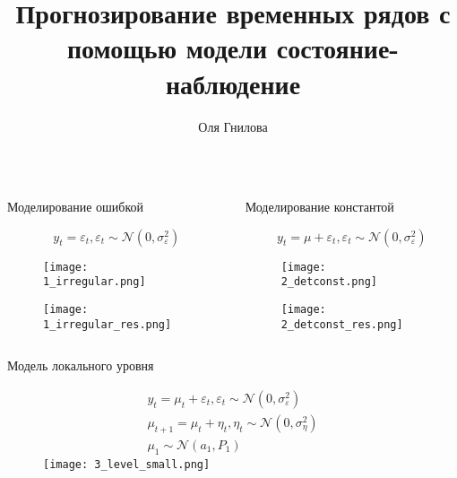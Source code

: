\documentclass{beamer}
\author[]{Оля Гнилова}
\title{Прогнозирование временных рядов с помощью модели состояние-наблюдение}
\institute{Высшая школа экономики, 2017}
\begin{document}
\begin{frame}[fragile]\centering

\begin{columns}[T]
\begin{column}{.32\textwidth}

\begin{columns}[T]
\begin{column}{.49\textwidth}

\begin{block}{ Моделирование ошибкой}



\[
y_t = \varepsilon_t, \varepsilon_t \sim \mathcal{N}(0, \sigma^2_\varepsilon)
\]

\begin{figure}[htb]
  \texttt{[image: 1\_irregular.png]}
\end{figure}
\begin{figure}[htb]
  \texttt{[image: 1\_irregular\_res.png]}
\end{figure}
\end{block}
\end{column}

\begin{column}{.49\textwidth}

\begin{block}{Моделирование константой}


\[
y_{t} = \mu + \varepsilon_{t}, \varepsilon_{t} \sim \mathcal{N}(0, \sigma^{2}_{\varepsilon})
\]

\begin{figure}[htb]
  \texttt{[image: 2\_detconst.png]}
\end{figure}
\begin{figure}[htb]
  \texttt{[image: 2\_detconst\_res.png]}
\end{figure}
\end{block}
\end{column}
\end{columns}

\begin{block}{Модель локального уровня}

\vspace{-0.25cm}

\begin{figure}[htb]
\begin{gather*}
y_{t} = \mu_{t} + \varepsilon_{t}, \varepsilon_{t} \sim \mathcal{N}(0, \sigma^2_\varepsilon) 
\\
\mu_{t+1} = \mu_{t} + \eta_{t}, \eta_{t} \sim \mathcal{N}(0, \sigma_{\eta}^{2}) 
\\
\mu_1 \sim \mathcal{N}(a_{1}, P_{1})
\end{gather*}
\endminipage \hfill
{}
\texttt{[image: 3\_level\_small.png]}
\endminipage\hfill
\end{figure}


\end{block}
\end{column}
\end{columns}
\end{frame}
\end{document}
